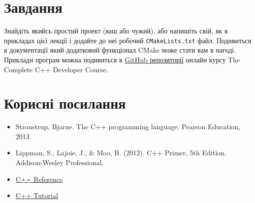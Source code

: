 \documentclass[12pt]{article}
\begin{document}
	\section*{Завдання}
	Знайдіть якийсь простий проект (ваш або чужий), або напишіть свій, як в прикладах цієї лекції і додайте до неї робочий \texttt{CMakeLists.txt} файл. Подивиться в документації який додатковий функціонал CMake може стати вам в нагоді. Приклади програм можна подивиться в \href{https://github.com/profjpbaugh/complete-cpp-developer-course}{GitHub репозиторії} онлайн курсу The Complete C++ Developer Course.
	
	\section*{Корисні посилання}
	
	\begin{itemize}
		\item Stroustrup, Bjarne. The C++ programming language. Pearson Education, 2013.
		\item Lippman, S., Lajoie, J., \& Moo, B. (2012). C++ Primer, 5th Edition. Addison-Wesley Professional.
		\item \href{https://en.cppreference.com/w/cpp}{C++ Reference}
		\item \href{http://www.cplusplus.com/doc/tutorial/}{C++ Tutorial}
	\end{itemize}
	
	
\end{document}
